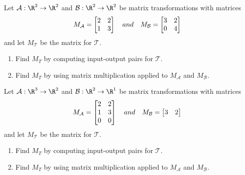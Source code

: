 \begin{exercises}
\begin{problist}
		\prob Let $\mathcal A: \R^2 \to \R^2$ and $\mathcal B: \R^2 \to \R^2$ be matrix transformations with matrices
		\[
		    M_{\mathcal A} = \mat{2&2\\1&3} \quad and \quad M_{\mathcal B} = \mat{3&2\\0&4}
		\]
		and let $M_{\mathcal T}$ be the matrix for $\mathcal T$.
		\begin{enumerate}
		    \item Find $M_T$ by computing input-output pairs for $\mathcal T$.
		    \item Find $M_T$ by using matrix multiplication applied to $M_{\mathcal A}$ and $M_{\mathcal B}$. 
		\end{enumerate}
		
		\prob Let $\mathcal A: \R^3 \to \R^2$ and $\mathcal B: \R^2 \to \R^1$ be matrix transformations with matrices
		\[
		    M_{\mathcal A} = \mat{2&2\\1&3\\0&0} \quad and \quad M_{\mathcal B} = \mat{3&2}
		\]
	    and let $M_{\mathcal T}$ be the matrix for $\mathcal T$.		\begin{enumerate}
		    \item Find $M_T$ by computing input-output pairs for $\mathcal T$.
		    \item Find $M_T$ by using matrix multiplication applied to $M_{\mathcal A}$ and $M_{\mathcal B}$. 
		\end{enumerate}
		\end{problist}
\end{exercises}
